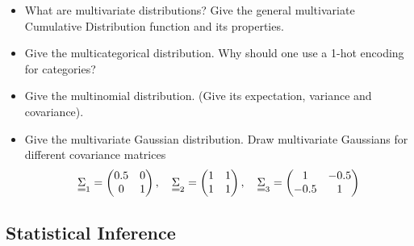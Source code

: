 \begin{itemize}
    \item What are multivariate distributions? Give the general multivariate Cumulative Distribution function and its properties.
    \item Give the multicategorical distribution. Why should one use a 1-hot encoding for categories?
    \item Give the multinomial distribution. (Give its expectation, variance and covariance).
    \item Give the multivariate Gaussian distribution. Draw multivariate Gaussians for different covariance matrices
    \begin{equation}
        \mat{\Sigma}_1 = \begin{pmatrix} 0.5 & 0 \\ 0 & 1 \end{pmatrix}, \quad \mat{\Sigma}_2 = \begin{pmatrix} 1 & 1 \\ 1 & 1 \end{pmatrix}, \quad \mat{\Sigma}_3 = \begin{pmatrix} 1 & -0.5 \\ -0.5 & 1 \end{pmatrix}
    \end{equation}
\end{itemize}

\subsection*{Statistical Inference}

